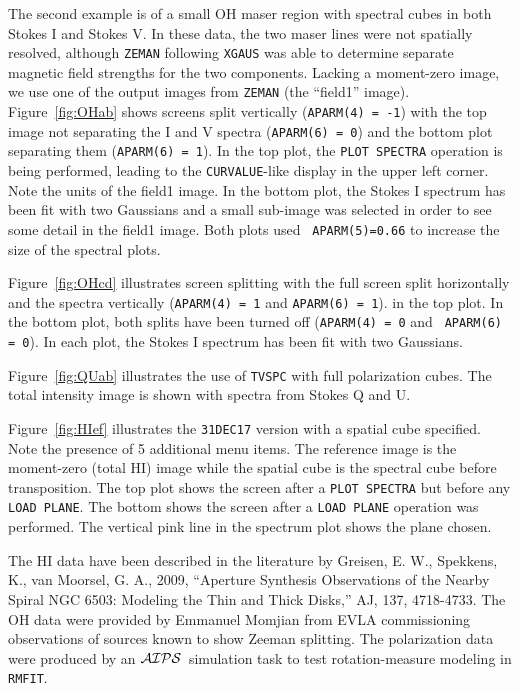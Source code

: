 \documentclass[twoside]{article}
\newcommand{\Me}[1]{\textcolor{mecol}{#1}}
\newcommand{\AIPS}{{$\cal AIPS\/$}}
\begin{document}
The second example is of a small OH maser region with spectral cubes in
both Stokes I and Stokes V\@.  In these data, the two maser lines were
not spatially resolved, although {\tt ZEMAN} following {\tt XGAUS} was
able to determine separate magnetic field strengths for the two
components.  Lacking a moment-zero image, we use one of the output
images from {\tt ZEMAN} (the ``field1'' image).  Figure~\ref{fig:OHab}
shows screens split vertically ({\tt APARM(4) = -1}) with the top
image not separating the I and V spectra ({\tt APARM(6) = 0}) and the
bottom plot separating them ({\tt APARM(6) = 1})\@.  In the top plot,
the {\tt PLOT SPECTRA} operation is being performed, leading to the
{\tt CURVALUE}-like display in the upper left corner.  Note the units
of the field1 image.  In the bottom plot, the Stokes I spectrum has
been fit with two Gaussians and a small sub-image was selected in
order to see some detail in the field1 image.  Both plots used {\tt
  APARM(5)=0.66} to increase the size of the spectral plots.

Figure~\ref{fig:OHcd} illustrates screen splitting with the full
screen split horizontally and the spectra vertically ({\tt APARM(4) =
1} and {\tt APARM(6) = 1})\@. in the top plot.  In the bottom plot,
both splits have been turned off ({\tt APARM(4) = 0} and {\tt
APARM(6) = 0}).  In each plot, the Stokes I spectrum has been fit
with two Gaussians.

Figure~\ref{fig:QUab} illustrates the use of {\tt TVSPC} with full
polarization cubes.  The total intensity image is shown with spectra
from Stokes Q and U.

\Me{Figure~\ref{fig:HIef} illustrates the {\tt 31DEC17} version with a
spatial cube specified.  Note the presence of 5 additional menu items.
The reference image is the moment-zero (total HI) image while the
spatial cube is the spectral cube before transposition.  The top plot
shows the screen after a {\tt PLOT SPECTRA} but before any {\tt LOAD
  PLANE}\@.  The bottom shows the screen after a {\tt LOAD PLANE}
operation was performed.  The vertical pink line in the spectrum plot
shows the plane chosen.}

The HI data have been described in the literature by Greisen, E. W.,
Spekkens, K., van Moorsel, G. A., 2009, ``Aperture Synthesis
Observations of the Nearby Spiral NGC 6503: Modeling the Thin and
Thick Disks,'' AJ, 137, 4718-4733.  The OH data were provided by
Emmanuel Momjian from EVLA commissioning observations of sources known
to show Zeeman splitting.  The polarization data were produced by
an \AIPS\ simulation task to test rotation-measure modeling in {\tt
  RMFIT}\@.
\end{document}
